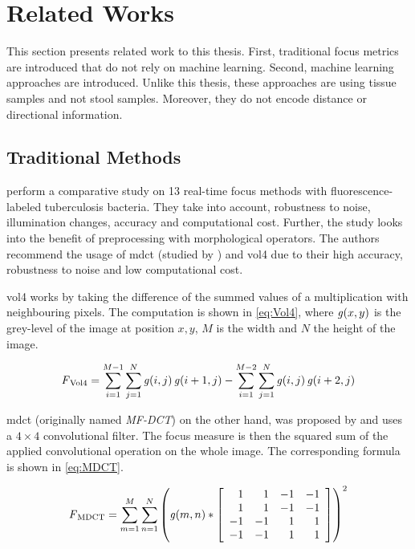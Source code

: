 \section{Related Works}
\label{sec:Foundations:RelatedWorks}

This section presents related work to this thesis. First, traditional focus metrics are introduced that do not rely on machine learning. Second, machine learning approaches are introduced. Unlike this thesis, these approaches are using tissue samples and not stool samples. Moreover, they do not encode distance or directional information.

\subsection{Traditional Methods}
\label{sec:Foundations:RelatedWorks:Traditional}


\textcite{mateos-perez2012comparative} perform a comparative study on 13 real-time focus methods with fluorescence-labeled tuberculosis bacteria. They take into account, robustness to noise, illumination changes, accuracy and computational cost. Further, the study looks into the benefit of preprocessing with morphological operators.
The authors recommend the usage of \ac{mdct} (studied by \textcite{lee2008enhanced}) and \ac{vol4} \cite{vollath1988influence} due to their high accuracy, robustness to noise and low computational cost.

\ac{vol4} works by taking the difference of the summed values of a multiplication with neighbouring pixels. The computation is shown in \autoref{eq:Vol4}, where $\operatorname{\mathit{g}}(x, y)$ is the grey-level of the image at position $x,y$, $M$ is the width and $N$ the height of the image.

\begin{equation}
    \label{eq:Vol4}
    \operatorname{\mathit{F}}_{\mathrm{Vol4}} = \sum_{i=1}^{M-1}\sum_{j=1}^{N} \operatorname{\mathit{g}}(i,j) \operatorname{\mathit{g}}(i+1, j) - \sum_{i=1}^{M-2}\sum_{j=1}^{N} \operatorname{\mathit{g}}(i,j) \operatorname{\mathit{g}}(i+2, j)
\end{equation}


\Ac{mdct} (originally named \emph{MF-DCT}) on the other hand, was proposed by \textcite{lee2008enhanced} and uses a $4 \times 4$ convolutional filter. The focus measure is then the squared sum of the applied convolutional operation on the whole image. The corresponding formula is shown in \autoref{eq:MDCT}.

\begin{equation}
    \label{eq:MDCT}
    \operatorname{\mathit{F}}_{\mathrm{MDCT}}= \sum_{m=1}^{M}\sum_{n=1}^{N}
    \left( {  
        \operatorname{\mathit{g}}(m,n) *
        \left[ {
            \begin{array}{rrrr}
                1 & 1 & -1 & -1 \\
                1 & 1 & -1 & -1 \\
                -1 & -1 & 1 & 1 \\
                -1 & -1 & 1 & 1
            \end{array} 
        } \right]
    } \right)^2
\end{equation}

